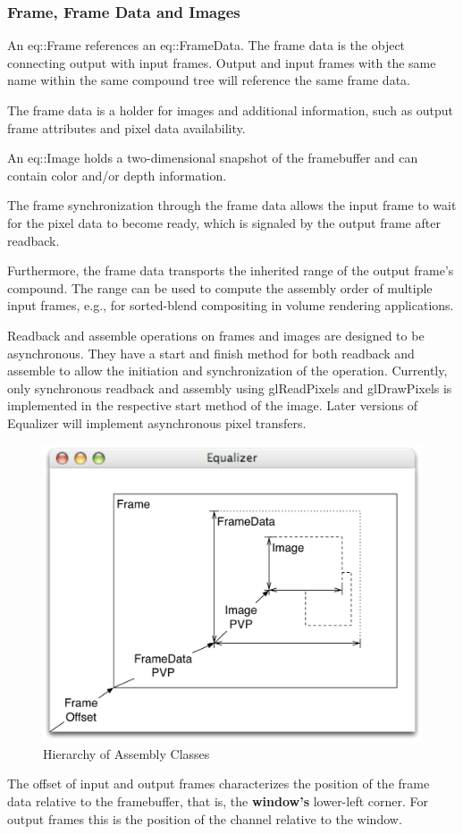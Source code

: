 \documentclass[10pt,a4]{scrartcl}
\begin{document}
\subsubsection{Frame, Frame Data and Images}

An \textsf{eq::Frame} references an \textsf{eq::Fra\-me\-Data}. The
frame data is the object connecting output with input frames. Output and
input frames with the same name within the same compound tree will
reference the same frame data.

The frame data is a holder for images and additional information, such
as output frame attributes and pixel data availability.

An \textsf{eq::Image} holds a
two-dimensional snapshot of the framebuffer and can contain color and/or
depth information.

The frame synchronization through the frame data allows the input frame
to wait for the pixel data to become ready, which is signaled by the
output frame after readback.

Furthermore, the frame data transports the inherited range of the output
frame's compound. The range can be used to compute the assembly order of
multiple input frames, e.g., for sorted-blend compositing in volume
rendering applications.

Readback and assemble operations on frames and images are designed to be
asynchronous. They have a start and finish method for both readback and
assemble to allow the initiation and synchronization of the operation.
Currently, only synchronous readback and assembly using
\textsf{glReadPixels} and \textsf{glDrawPixels} is implemented in the
respective start method of the image. Later versions of Equalizer will
implement asynchronous pixel transfers.

\begin{figure}
  \includegraphics[width=.618\textwidth]{images/assembly.pdf}
  {\caption{\label{fAssembly}Hierarchy of Assembly Classes}}
\end{figure}
The offset of input and output frames characterizes the position of the
frame data relative to the framebuffer, that is, the \textbf{window's}
lower-left corner. For output frames this is the position of the channel
relative to the window.
\end{document}
